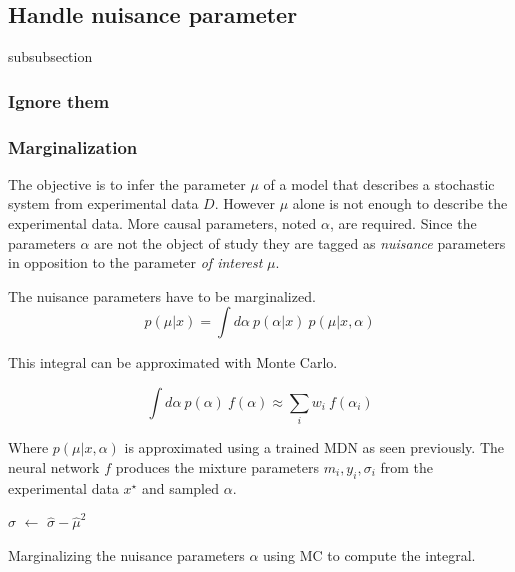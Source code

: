 \subsection{Handle nuisance parameter} %
\label{sub:handle_nuisance_parameter}


subsubsection
\subsubsection{Ignore them} %
\label{subsub:ignore_them}







\subsubsection{Marginalization} %
\label{subsub:marginalization}


The objective is to infer the parameter $\mu$ of a model that describes a stochastic system from experimental data $D$.
However $\mu$ alone is not enough to describe the experimental data.
More causal parameters, noted $\alpha$, are required.
Since the parameters $\alpha$ are not the object of study they are tagged as \emph{nuisance} parameters in opposition to the parameter \emph{of interest} $\mu$.

The nuisance parameters have to be marginalized.
\begin{equation}
    p(\mu | x) = \int d\alpha ~ p(\alpha | x) ~ p(\mu | x, \alpha)
\end{equation}

This integral can be approximated with Monte Carlo.

\begin{equation}
  \int d\alpha ~ p(\alpha) ~ f(\alpha)
  \approx \sum_i w_i ~ f(\alpha_i)
\end{equation}

Where $p(\mu | x, \alpha)$ is approximated using a trained MDN as seen previously.
The neural network $f$ produces the mixture parameters $m_i, y_i, \sigma_i$ from the experimental data $x^\star$ and sampled $\alpha$.

\begin{algorithm}[H]
$\hat\sigma$  $\gets$ $\hat\sigma - \hat\mu^2$ \;
\caption{Marginalizing the nuisance parameters $\alpha$ using MC to compute the integral.}
\end{algorithm}







